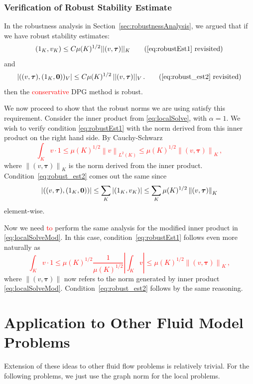 \documentclass[letterpaper]{article}
\def\btau{\boldsymbol\tau}
\def\bftau{\boldsymbol\tau}
\newcommand{\norm}[1]{\left\| #1 \right\|}
\newcommand{\LRl}[1]{\left| #1 \right|}
\newcommand{\red}[1]{\textcolor{red}{#1}}
\begin{document}
\subsubsection{Verification of Robust Stability Estimate}
In the robustness analysis in Section~\ref{sec:robustnessAnalysis}, we argued
that if we have robust stability estimates:
\begin{equation}
(1_K, v_K) \leq C \mu(K)^{1/2} || (v,\bftau) ||_K
\tag{\ref{eq:robustEst1} revisited}
\end{equation}
and
\begin{equation}
| ((v,\bftau),(1_K,{\bf 0}))_V | \leq C \mu(K)^{1/2} \, || (v,\bftau) ||_V\,.
\tag{\ref{eq:robust_est2} revisited}
\end{equation}
then the \red{conservative} DPG method is robust.

We now proceed to show that the robust norms we are using satisfy this
requirement.
Consider the inner product from \eqref{eq:localSolve}, with
$\alpha=1$. We wish to
verify condition \eqref{eq:robustEst1} with the norm derived from this inner
product on the right hand side. By Cauchy-Schwarz
\red{
\begin{equation}
   \int_K v\cdot
   1\leq\mu(K)^{1/2}\norm{v}_{L^2(K)}\leq\mu(K)^{1/2}\norm{(v,\btau)}_K\,,
   \label{eq:robustProof}
\end{equation}
}
where $\norm{(v,\btau)}_K$ is the norm derived from the inner product.
Condition~\eqref{eq:robust_est2} comes out the same since
$$|(
(v,\btau),(1_K,{\bf0}))| \leq
\sum_K|(1_K,v_K)|\leq\sum_K\mu(K)^{1/2}\norm{(v,\btau)}_K
$$
element-wise.

Now we need \red{to} perform the same analysis for the modified inner product in
\eqref{eq:localSolveMod}. In this case,
condition~\eqref{eq:robustEst1} follows even more naturally as
\red{
\begin{equation}
   \int_K v\cdot1\leq\mu(K)^{1/2}\frac{1}{\mu(K)^{1/2}}\LRl{\int_Kv}
   \leq\mu(K)^{1/2}\norm{(v,\btau)}_K\,,
   \label{eq:robustProof2}
\end{equation}
}
where $\norm{(v,\btau)}$ now refers to the norm generated by inner product
\eqref{eq:localSolveMod}. Condition~\eqref{eq:robust_est2} follows by the same
reasoning.

\section{Application to Other Fluid Model Problems}
Extension of these ideas to other fluid flow problems is relatively trivial.
For the following problems, we just use the graph norm for the local problems.
\end{document}
